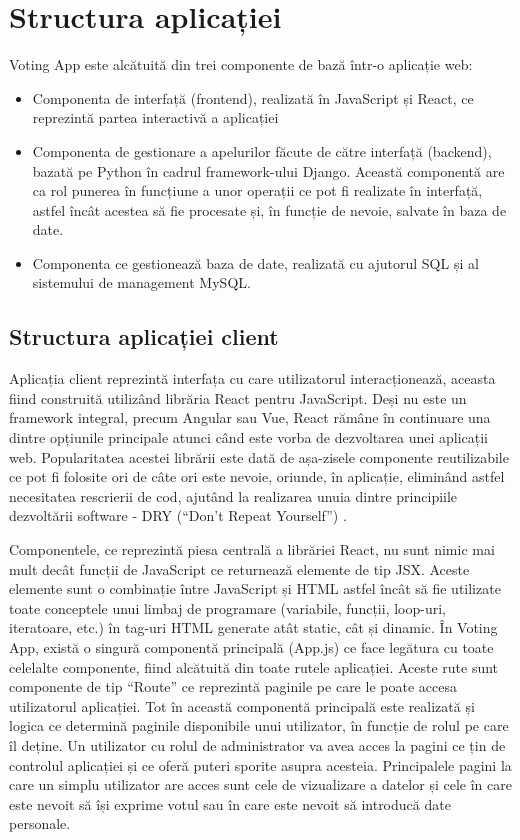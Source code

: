 \section{Structura aplicației}

Voting App este alcătuită din trei componente de bază într-o aplicație web:

\begin{itemize}
    \item Componenta de interfață (frontend), realizată în JavaScript și React, ce reprezintă partea interactivă a aplicației
    \item Componenta de gestionare a apelurilor făcute de către interfață (backend), bazată pe Python în cadrul framework-ului Django. Această componentă are ca rol punerea în funcțiune a unor operații ce pot fi realizate în interfață, astfel încât acestea să fie procesate și, în funcție de nevoie, salvate în baza de date.
    \item Componenta ce gestionează baza de date, realizată cu ajutorul SQL și al sistemului de management MySQL.
\end{itemize}

\subsection{Structura aplicației client}

Aplicația client reprezintă interfața cu care utilizatorul interacționează, aceasta fiind construită utilizând librăria React pentru JavaScript. Deși nu este un framework integral, precum Angular sau Vue, React rămâne în continuare una dintre opțiunile principale atunci când este vorba de dezvoltarea unei aplicații web. Popularitatea acestei librării este dată de așa-zisele componente reutilizabile ce pot fi folosite ori de câte ori este nevoie, oriunde, în aplicație, eliminând astfel necesitatea rescrierii de cod, ajutând la realizarea unuia dintre principiile dezvoltării software - DRY (\enquote{Don't Repeat Yourself}) \cite{DRY_book}.

Componentele, ce reprezintă piesa centrală a librăriei React, nu sunt nimic mai mult decât funcții de JavaScript ce returnează elemente de tip JSX. Aceste elemente sunt o combinație între JavaScript și HTML astfel încât să fie utilizate toate conceptele unui limbaj de programare (variabile, funcții, loop-uri, iteratoare, etc.) în tag-uri HTML generate atât static, cât și dinamic. În Voting App, există o singură componentă principală (App.js) ce face legătura cu toate celelalte componente, fiind alcătuită din toate rutele aplicației. Aceste rute sunt componente de tip \enquote{Route} ce reprezintă paginile pe care le poate accesa utilizatorul aplicației. Tot în această componentă principală este realizată și logica ce determină paginile disponibile unui utilizator, în funcție de rolul pe care îl deține. Un utilizator cu rolul de administrator va avea acces la pagini ce țin de controlul aplicației și ce oferă puteri sporite asupra acesteia. Principalele pagini la care un simplu utilizator are acces sunt cele de vizualizare a datelor și cele în care este nevoit să își exprime votul sau în care este nevoit să introducă date personale.

